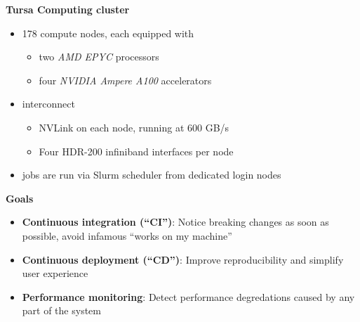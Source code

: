 \documentclass[english,11pt]{beamer}
\begin{document}
\begin{frame}
 \textbf{Tursa Computing cluster}
 \begin{itemize}
  \item 178 compute nodes, each equipped with
  \begin{itemize}
    \item two \emph{AMD EPYC} processors
    \item four \emph{NVIDIA Ampere A100} accelerators
  \end{itemize}
  \item interconnect
  \begin{itemize}
   \item NVLink on each node, running at 600 GB/s
   \item Four HDR-200 infiniband interfaces per node
  \end{itemize}

  \item jobs are run via Slurm scheduler from dedicated login nodes

 \end{itemize}

\end{frame}

\begin{frame}

\textbf{Goals}
\begin{itemize}
 \item \textbf{Continuous integration (``CI'')}: Notice breaking changes as soon as possible, avoid infamous ``works on my machine''
 \item \textbf{Continuous deployment (``CD'')}: Improve reproducibility and simplify user experience
 \item \textbf{Performance monitoring}: Detect performance degredations caused by any part of the system
\end{itemize}

\end{frame}
\end{document}
